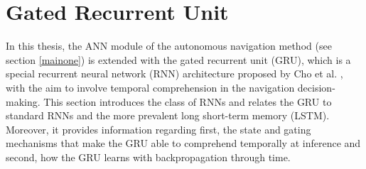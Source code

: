 \section{Gated Recurrent Unit} \label{sec:gru}
In this thesis,
the ANN module of the autonomous navigation method (see section \ref{mainone})
is extended with the gated recurrent unit (GRU), 
which is a special recurrent neural network (RNN) architecture
proposed by Cho et al. \cite{Cho2014},
with the aim to involve temporal comprehension in
the navigation decision-making.
This section introduces the class of RNNs
and relates the GRU to standard RNNs
and the more prevalent long short-term memory (LSTM).
Moreover, it provides information regarding first,
the state and gating mechanisms that make the GRU able to comprehend temporally at inference
and second, how the GRU learns with backpropagation through time.

